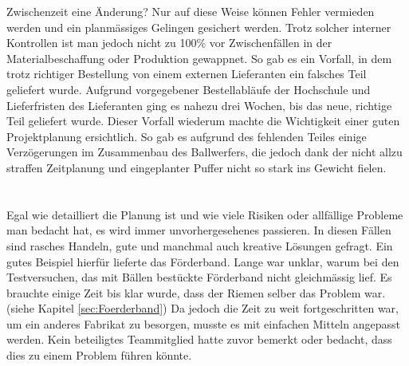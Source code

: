Zwischenzeit eine Änderung? Nur auf diese Weise können Fehler vermieden werden und ein planmässiges Gelingen gesichert werden. 
Trotz solcher interner Kontrollen ist man jedoch nicht zu 100\% vor Zwischenfällen in der Materialbeschaffung 
oder Produktion gewappnet. So gab es ein Vorfall, in dem trotz richtiger Bestellung von einem externen Lieferanten 
ein falsches Teil geliefert wurde. Aufgrund vorgegebener Bestellabläufe der Hochschule und Lieferfristen des 
Lieferanten ging es nahezu drei Wochen, bis das neue, richtige Teil geliefert wurde. Dieser Vorfall wiederum 
machte die Wichtigkeit einer guten Projektplanung ersichtlich. So gab es aufgrund des fehlenden Teiles einige 
Verzögerungen im Zusammenbau des Ballwerfers, die jedoch dank der nicht allzu straffen Zeitplanung und 
eingeplanter Puffer nicht so stark ins Gewicht fielen.\\
\\
\\ 
Egal wie detailliert die Planung ist und wie viele Risiken oder allfällige Probleme man bedacht hat, es wird immer unvorhergesehenes passieren. 
In diesen Fällen sind rasches Handeln, gute und manchmal auch kreative Lösungen gefragt. Ein gutes Beispiel hierfür lieferte das Förderband.
Lange war unklar, warum bei den Testversuchen, das mit Bällen bestückte Förderband nicht gleichmässig lief. 
Es brauchte einige Zeit bis klar wurde, dass der Riemen selber das Problem war. (siehe Kapitel \ref{sec:Foerderband})
Da jedoch die Zeit zu weit fortgeschritten war, um ein anderes Fabrikat zu besorgen, musste es mit einfachen Mitteln angepasst werden. 
Kein beteiligtes Teammitglied hatte zuvor bemerkt oder bedacht, dass dies zu einem Problem führen könnte. 
